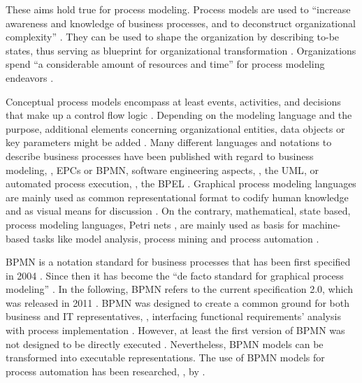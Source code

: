 These aims hold true for process modeling. Process models are used to \enquote{increase awareness and knowledge of business processes, and to deconstruct organizational complexity} \citep[]{Recker2010}. They can be used to shape the organization by describing to-be states, thus serving as blueprint for organizational transformation \citep[]{Dumas2013}. Organizations spend \enquote{a considerable amount of resources and time} for process modeling endeavors \citep[]{Recker2010}. 

Conceptual process models encompass at least events, activities, and decisions that make up a control flow logic \citep[]{Dumas2013}. Depending on the modeling language and the purpose, additional elements concerning organizational entities, data objects or key parameters might be added \citep[]{Recker2010}. Many different languages and notations to describe business processes have been published with regard to business modeling,  \eg, \acp{EPC} or \ac{BPMN},  software engineering aspects, \eg, the \ac{UML}, or automated process execution, \eg, the \ac{BPEL} \citep[]{Recker2007}.
Graphical process modeling languages are mainly used as common representational format to codify human knowledge and as visual means for discussion \citep[][]{Curtis1992}. On the contrary, mathematical, state based, process modeling languages, \eg Petri nets \citep{Petri1962}, are mainly used as basis for machine-based tasks like model analysis, process mining and process automation \citep[]{Recker2010}. 

\ac{BPMN} is a notation standard for business processes that has been first specified in 2004 \citep{Omg2004}. Since then it has become the \enquote{de facto standard for graphical process modeling} \citep[]{Recker2010}. In the following, \ac{BPMN} refers to the current specification 2.0, which was released in 2011 \citep{OMG2011}. \ac{BPMN} was designed to create a common ground for both business and IT representatives, \ie, interfacing functional requirements' analysis with process implementation \citep[]{Kossak2014}. However, at least the first version of \ac{BPMN} was not designed to be directly executed \citep[]{vanDerAalst2010}. Nevertheless, \ac{BPMN} models can be transformed into executable representations. The use of \ac{BPMN} models for process automation has been researched, \eg, by \cite{Decker2010}. 


